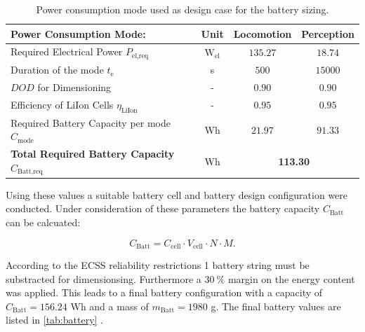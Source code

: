 \begin{table}[htb]
\centering
\caption{Power consumption mode used as design case for the battery sizing.}
\begin{tabular}{lccc}
\toprule
\textbf{Power Consumption Mode:}             &     \textbf{Unit}      & \textbf{Locomotion} & \textbf{Perception} \\
\midrule
Required Electrical Power $P_\text{el,req}$ & $\text{W}_\text{el}$         & $135.27$              & $18.74$               \\
Duration of the mode $t_\text{e}$ & s                         & $500$              & $15000$            \\
$DOD$ for Dimensioning               &     -          & $0.90$                & $0.90$                \\
Efficiency of LiIon Cells $\eta_\text{LiIon}$   &  -  & $0.95$                & $0.95$                \\
Required Battery Capacity per mode $C_\text{mode}$ & Wh & $21.97$              & $91.33$              \\
\textbf{Total Required Battery Capacity} $C_\text{Batt,req}$  & Wh & \multicolumn{2}{c}{\textbf{113.30}}               \\
\bottomrule
\end{tabular}


\label{tab:batsize}
\end{table}

Using these values a suitable battery cell and battery design configuration were conducted. Under consideration of these parameters the battery capacity $C_\text{Batt}$ can be calcuated:

\begin{equation}
C_\text{Batt} = C_\text{cell} \cdot V_\text{cell} \cdot N \cdot M .
\label{eq:batuse}
\end{equation}

According to the ECSS reliability restrictions 1 battery string must be substracted for dimensionsing. Furthermore a $30~\%$ margin on the energy content was applied. This leads to a final battery configuration with a capacity of $C_\text{Batt}=156.24$ Wh and a mass of $m_\text{Batt} = 1980$ g. The final battery values are listed in \autoref{tab:battery} \cite{SAFTBatteries.2018}.


